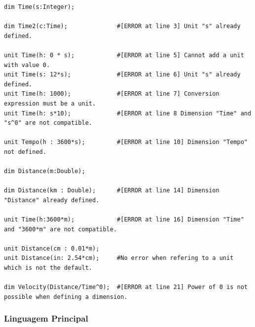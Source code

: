 \documentclass[10pt,portuguese]{article}
\begin{document}
\begin{lstlisting}[numbers=none]
dim Time(s:Integer);

dim Time2(c:Time);              #[ERROR at line 3] Unit "s" already defined.

unit Time(h: 0 * s);            #[ERROR at line 5] Cannot add a unit with value 0.
unit Time(s: 12*s);             #[ERROR at line 6] Unit "s" already defined.
unit Time(h: 1000);             #[ERROR at line 7] Conversion expression must be a unit.
unit Time(h: s*10);             #[ERROR at line 8 Dimension "Time" and "s^0" are not compatible.

unit Tempo(h : 3600*s);         #[ERROR at line 10] Dimension "Tempo" not defined.

dim Distance(m:Double);

dim Distance(km : Double);      #[ERROR at line 14] Dimension "Distance" already defined.

unit Time(h:3600*m);            #[ERROR at line 16] Dimension "Time" and "3600*m" are not compatible.

unit Distance(cm : 0.01*m);
unit Distance(in: 2.54*cm);     #No error when refering to a unit which is not the default.

dim Velocity(Distance/Time^0);  #[ERROR at line 21] Power of 0 is not possible when defining a dimension.
\end{lstlisting}

\subsubsection{Linguagem Principal}
\end{document}

